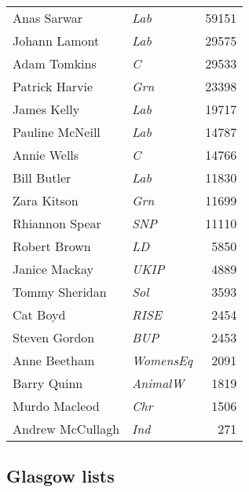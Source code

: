 {\footnotesize
\begin{tabular*}{\columnwidth}{@{\extracolsep{\fill}} p{} >{\itshape}l r @{\extracolsep{\fill}}}
	Anas Sarwar & Lab & 59151\\
	Johann Lamont & Lab & 29575\\%
	Adam Tomkins & C & 29533\\
	Patrick Harvie & Grn & 23398\\
	James Kelly & Lab & 19717\\%
	Pauline McNeill & Lab & 14787\\%
	Annie Wells & C & 14766\\%
	\hline
	Bill Butler & Lab & 11830\\%
	Zara Kitson & Grn & 11699\\%
	Rhiannon Spear & SNP & 11110\\%
	Robert Brown & LD & 5850\\
	Janice Mackay & UKIP & 4889\\
	Tommy Sheridan & Sol & 3593\\
	Cat Boyd & RISE & 2454\\
	Steven Gordon & BUP & 2453\\
	Anne Beetham & WomensEq & 2091\\
	Barry Quinn & AnimalW & 1819\\
	Murdo Macleod & Chr & 1506\\
	Andrew McCullagh & Ind & 271\\
\end{tabular*}

}

\subsection*{Glasgow lists}

